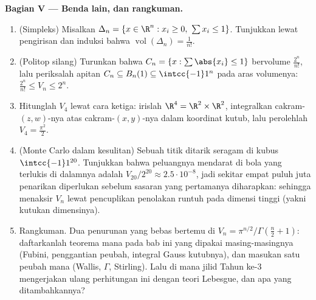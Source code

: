 \begin{problem}[{Soal akhir pekan --- $V_n =
\pi^{n/2}/\Gamma(\frac n2 + 1)$, dan keanehan dimensi
tinggi}]
\medskip
\noindent\textbf{Bagian V --- Benda lain, dan rangkuman.}
\begin{enumerate}[resume]
  \item (Simpleks) Misalkan $\Delta_n = \{x \in \R^n : x_i \geq 0,\
        \sum x_i \leq 1\}$. Tunjukkan lewat pengirisan dan induksi bahwa
        $\operatorname{vol}(\Delta_n) = \frac1{n!}$.
  \item (Politop silang) Turunkan bahwa $C_n = \{x :
        \sum\abs{x_i} \leq 1\}$ bervolume $\frac{2^n}{n!}$,
        lalu periksalah apitan $C_n \subseteq B_n(1)
        \subseteq \intcc{-1}1^n$ pada aras volumenya:
        $\frac{2^n}{n!} \leq V_n \leq 2^n$.
  \item Hitunglah $V_4$ lewat cara ketiga: irislah $\R^4 = \R^2 \times
        \R^2$, integralkan \omterm{def:b2:multint:domain}{luas} cakram-$(z, w)$-nya atas
        cakram-$(x, y)$-nya dalam koordinat kutub, lalu perolehlah
        $V_4 = \frac{\pi^2}2$.
  \item (Monte Carlo dalam kesulitan) Sebuah titik ditarik seragam
        di kubus $\intcc{-1}1^{20}$. Tunjukkan bahwa
        peluangnya mendarat di bola yang terlukis di dalamnya adalah
        $V_{20}/2^{20} \approx 2.5\cdot10^{-8}$, jadi sekitar
        empat puluh juta penarikan diperlukan sebelum sasaran yang pertamanya
        diharapkan: sehingga menaksir $V_n$ lewat pencuplikan penolakan
        runtuh pada dimensi tinggi (yakni kutukan
        dimensinya).
  \item Rangkuman. Dua penurunan yang bebas bertemu di $V_n =
        \pi^{n/2}/\Gamma(\frac n2 + 1)$: daftarkanlah teorema mana
        pada bab ini yang dipakai masing-masingnya (Fubini, penggantian
        peubah, integral Gauss kutubnya), dan masukan
        satu peubah mana (Wallis, $\Gamma$, Stirling).
        Lalu di mana jilid Tahun ke-3 mengerjakan ulang perhitungan ini
        dengan teori Lebesgue, dan apa yang ditambahkannya?

\end{enumerate}
\end{problem}
